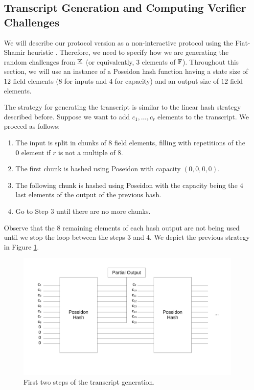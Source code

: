 

\subsection{Transcript Generation and Computing Verifier Challenges}\label{sec:transcript-gen}

We will describe our protocol version as a non-interactive protocol using the Fiat-Shamir heuristic \cite{C:FiaSha86}. Therefore, we need to specify how we are generating the random challenges from $\mathbb{K}$ (or equivalently, $3$ elements of $\mathbb{F}$). Throughout this section, we will use an instance of a Poseidon hash function having a state size of $12$ field elements ($8$ for inputs and $4$ for capacity) and an output size of $12$ field elements. 

The strategy for generating the transcript is similar to the linear hash strategy described before. Suppose we want to add $c_1, \dots, c_r$ elements to the transcript. We proceed as follows:

\begin{enumerate}

\item The input is split in chunks of $8$ field elements, filling with repetitions of the $0$ element if $r$ is not a multiple of $8$. 

\item The first chunk is hashed using Poseidon with capacity $(0,0,0,0)$.

\item The following chunk is hashed using Poseidon with the capacity being the $4$ last elements of the output of the previous hash. 

\item Go to Step $3$ until there are no more chunks. 

\end{enumerate}

Observe that the $8$ remaining elements of each hash output are not being used until we stop the loop between the steps $3$ and $4$. We depict the previous strategy in Figure \ref{fig:transcript-gen}.  

\begin{figure}[h!]
\centering
\includegraphics[width=.8\textwidth]{../figures/transcript}
\caption{First two steps of the transcript generation.}
\label{fig:transcript-gen}
\end{figure}

